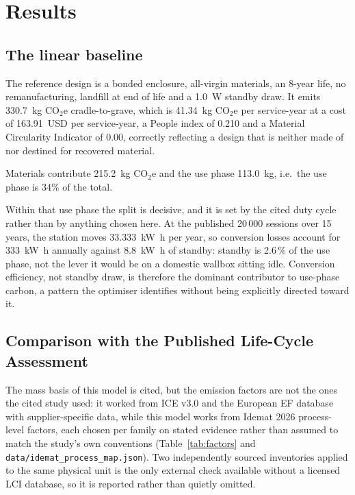 \documentclass[11pt,a4paper]{article}
\begin{document}
\FloatBarrier
\section{Results}

\subsection{The linear baseline}

The reference design is a bonded enclosure, all-virgin materials, an
8-year life, no remanufacturing, landfill at end of life and a
\SI{1.0}{\watt} standby draw. It emits
\SI{330.7}{\kilo\gram} CO$_2$e cradle-to-grave,
which is \SI{41.34}{\kilo\gram}
CO$_2$e per service-year at a cost of
163.91~USD per service-year, a
People index of 0.210 and a Material Circularity
Indicator of 0.00, correctly reflecting a design that is neither made of nor
destined for recovered material.

Materials contribute
\SI{215.2}{\kilo\gram} CO$_2$e and the use
phase \SI{113.0}{\kilo\gram}, i.e.\ the use phase
is 34\% of the
total.

Within that use phase the split is decisive, and it is set by the cited duty
cycle rather than by anything chosen here. At the published
20\,000 sessions over 15 years, the station moves
\SI{33,333}{\kilo\watt\hour} per year, so conversion losses account
for \SI{333}{\kilo\watt\hour} annually against
\SI{8.8}{\kilo\watt\hour} of standby: standby is 2.6\,\% of
the use phase, not the lever it would be on a domestic wallbox sitting idle.
Conversion efficiency, not standby draw, is therefore the dominant contributor
to use-phase carbon, a pattern the optimiser identifies without being
explicitly directed toward it.

\FloatBarrier
\subsection{Comparison with the Published Life-Cycle Assessment}
\label{sec:validation}

The mass basis of this model is cited, but the emission factors are not the
ones the cited study used: it worked from ICE v3.0 and the European EF
database with supplier-specific data, while this model works from Idemat 2026
process-level factors, each chosen per family on stated evidence rather than
assumed to match the study's own conventions (Table~\ref{tab:factors} and
\texttt{data/idemat\_process\_map.json}). Two independently sourced
inventories applied to the same physical unit is the only external check
available without a licensed LCI database, so it is reported rather than
quietly omitted.
\end{document}
